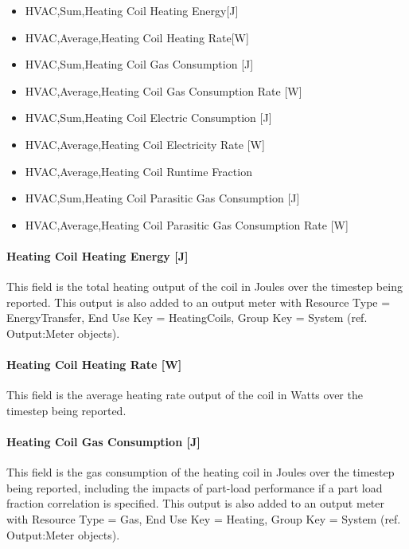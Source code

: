 \begin{itemize}
\item
  HVAC,Sum,Heating Coil Heating Energy{[}J{]}
\item
  HVAC,Average,Heating Coil Heating Rate{[}W{]}
\item
  HVAC,Sum,Heating Coil Gas Consumption {[}J{]}
\item
  HVAC,Average,Heating Coil Gas Consumption Rate {[}W{]}
\item
  HVAC,Sum,Heating Coil Electric Consumption {[}J{]}
\item
  HVAC,Average,Heating Coil Electricity Rate {[}W{]}
\item
  HVAC,Average,Heating Coil Runtime Fraction
\item
  HVAC,Sum,Heating Coil Parasitic Gas Consumption {[}J{]}
\item
  HVAC,Average,Heating Coil Parasitic Gas Consumption Rate {[}W{]}
\end{itemize}

\paragraph{Heating Coil Heating Energy {[}J{]}}\label{heating-coil-energy-j-1}

This field is the total heating output of the coil in Joules over the timestep being reported. This output is also added to an output meter with Resource Type = EnergyTransfer, End Use Key = HeatingCoils, Group Key = System (ref. Output:Meter objects).

\paragraph{Heating Coil Heating Rate {[}W{]}}\label{heating-coil-rate-w}

This field is the average heating rate output of the coil in Watts over the timestep being reported.

\paragraph{Heating Coil Gas Consumption {[}J{]}}\label{heating-coil-gas-consumption-j}

This field is the gas consumption of the heating coil in Joules over the timestep being reported, including the impacts of part-load performance if a part load fraction correlation is specified. This output is also added to an output meter with Resource Type = Gas, End Use Key = Heating, Group Key = System (ref. Output:Meter objects).

